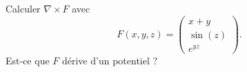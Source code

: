 
\begin{exercice}\label{exoOutilsMath-0141}

    Calculer \( \nabla\times F\) avec
    \begin{equation}
        F(x,y,z)=\begin{pmatrix}
            x+y    \\ 
            \sin(z)    \\ 
            e^{yz}    
        \end{pmatrix}.
    \end{equation}
    Est-ce que \( F\) dérive d'un potentiel ?

\end{exercice}
